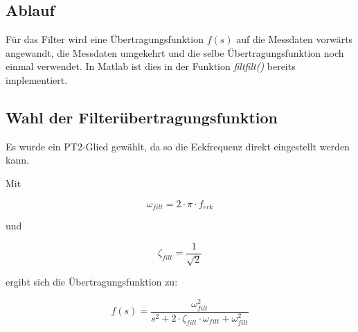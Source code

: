 \subsection{Ablauf}

Für das Filter wird eine Übertragungsfunktion $f(s)$ auf die Messdaten vorwärts 
angewandt, die Messdaten umgekehrt und die selbe Übertragungsfunktion noch 
einmal verwendet. In Matlab ist dies in der Funktion \textit{filtfilt()} 
bereits implementiert. 

\subsection{Wahl der Filterübertragungsfunktion}

Es wurde ein PT2-Glied gewählt, da so die Eckfrequenz direkt eingestellt werden kann. %

Mit

\begin{equation}
	\omega_{filt} = 2 \cdot \pi \cdot f_{eck}
\end{equation}

und

\begin{equation}
	\zeta_{filt} = \frac{1}{\sqrt{2}}
\end{equation}

ergibt sich die Übertragungsfunktion zu:

\begin{equation}
	f(s) = \frac{\omega_{filt}^2}{s^2+2 \cdot \zeta_{filt} \cdot \omega_{filt} +\omega_{filt}^2}
\end{equation}